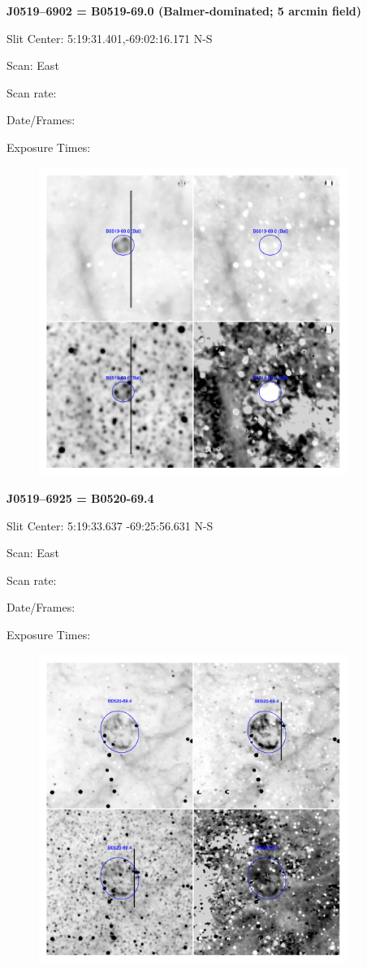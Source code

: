 \documentclass[11pt]{article}
\begin{document}
\newpage
{\bf J0519--6902 = B0519-69.0 (Balmer-dominated; 5 arcmin field)}  
 
Slit Center:   5:19:31.401,-69:02:16.171 N-S

Scan:  East

Scan rate:  

Date/Frames:

Exposure Times:  

\begin{figure}
\includegraphics[width=10.05cm]{snapshots/B0519-690_5arcmin.png}
\end{figure}

\newpage
{\bf J0519--6925 = B0520-69.4}  
 
Slit Center:   5:19:33.637  -69:25:56.631 N-S

Scan:  East

Scan rate:  

Date/Frames:

Exposure Times:  

\begin{figure}
\includegraphics[width=10.05cm]{snapshots/B0520-694.png}
\end{figure}
\end{document}
